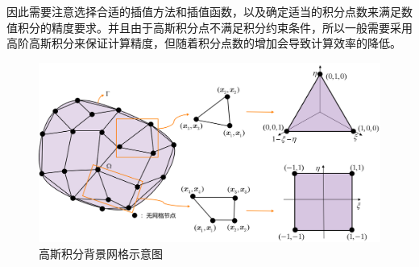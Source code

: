 因此需要注意选择合适的插值方法和插值函数，以及确定适当的积分点数来满足数值积分的精度要求。并且由于高斯积分点不满足积分约束条件，所以一般需要采用高阶高斯积分来保证计算精度，但随着积分点数的增加会导致计算效率的降低。
\begin{figure}[H]
\centering
\includegraphics[scale=0.5]{figure/C2/GI.png}
\caption{高斯积分背景网格示意图}\label{C2GI}
\end{figure}
